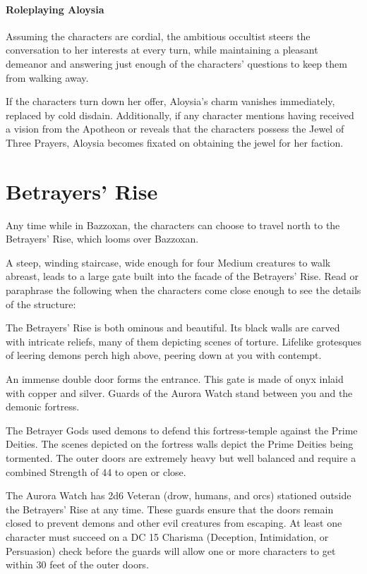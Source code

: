 \documentclass[10pt,a4paper,twoside,bg=print,twocolumn,openany,nodeprecatedcode]{dndbook}
\begin{document}
\paragraph{Roleplaying Aloysia}
Assuming the characters are cordial, the ambitious occultist steers the conversation to her interests at every turn, while maintaining a pleasant demeanor and answering just enough of the characters' questions to keep them from walking away.

If the characters turn down her offer, Aloysia's charm vanishes immediately, replaced by cold disdain. Additionally, if any character mentions having received a vision from the Apotheon or reveals that the characters possess the Jewel of Three Prayers, Aloysia becomes fixated on obtaining the jewel for her faction.

\section{Betrayers' Rise}
Any time while in Bazzoxan, the characters can choose to travel north to the Betrayers' Rise, which looms over Bazzoxan.

A steep, winding staircase, wide enough for four Medium creatures to walk abreast, leads to a large gate built into the facade of the Betrayers' Rise. Read or paraphrase the following when the characters come close enough to see the details of the structure:

\begin{DndReadAloud}{}
The Betrayers' Rise is both ominous and beautiful. Its black walls are carved with intricate reliefs, many of them depicting scenes of torture. Lifelike grotesques of leering demons perch high above, peering down at you with contempt.

An immense double door forms the entrance. This gate is made of onyx inlaid with copper and silver. Guards of the Aurora Watch stand between you and the demonic fortress.

\end{DndReadAloud}

The Betrayer Gods used demons to defend this fortress-temple against the Prime Deities. The scenes depicted on the fortress walls depict the Prime Deities being tormented. The outer doors are extremely heavy but well balanced and require a combined Strength of 44 to open or close.

The Aurora Watch has 2d6 Veteran (drow, humans, and orcs) stationed outside the Betrayers' Rise at any time. These guards ensure that the doors remain closed to prevent demons and other evil creatures from escaping. At least one character must succeed on a DC 15 Charisma (Deception, Intimidation, or Persuasion) check before the guards will allow one or more characters to get within 30 feet of the outer doors.
\end{document}
